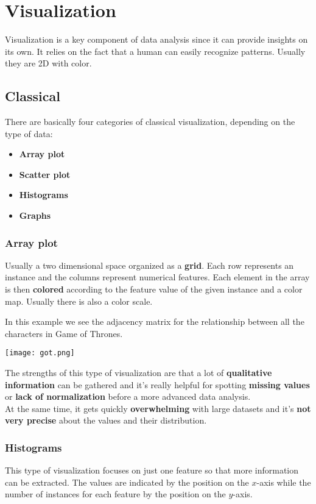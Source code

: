 \newpage
\section{Visualization}
Visualization is a key component of data analysis since it can provide insights on its own. It relies on the fact that a human can easily recognize patterns. Usually they are 2D with color.
\subsection{Classical}
There are basically four categories of classical visualization, depending on the type of data:
\begin{itemize}
	\item \textbf{Array plot}
	\item \textbf{Scatter plot}
	\item \textbf{Histograms}
	\item \textbf{Graphs}
\end{itemize}

\subsubsection{Array plot}
Usually a two dimensional space organized as a \textbf{grid}. Each row represents an instance and the columns represent numerical features. Each element in the array is then \textbf{colored} according to the feature value of the given instance and a color map. Usually there is also a color scale.

\begin{example}
	In this example we see the adjacency matrix for the relationship between all the characters in Game of Thrones.
	\begin{center}
		\texttt{[image: got.png]}
	\end{center}
\end{example}

The strengths of this type of visualization are that a lot of \textbf{qualitative information} can be gathered and it's really helpful for spotting \textbf{missing values} or \textbf{lack of normalization} before a more advanced data analysis.\\
At the same time, it gets quickly \textbf{overwhelming} with large datasets and it's \textbf{not very precise} about the values and their distribution.
\newpage
\subsubsection{Histograms}
This type of visualization focuses on just one feature so that more information can be extracted. The values are indicated by the position on the $x$-axis while the number of instances for each feature by the position on the $y$-axis.

